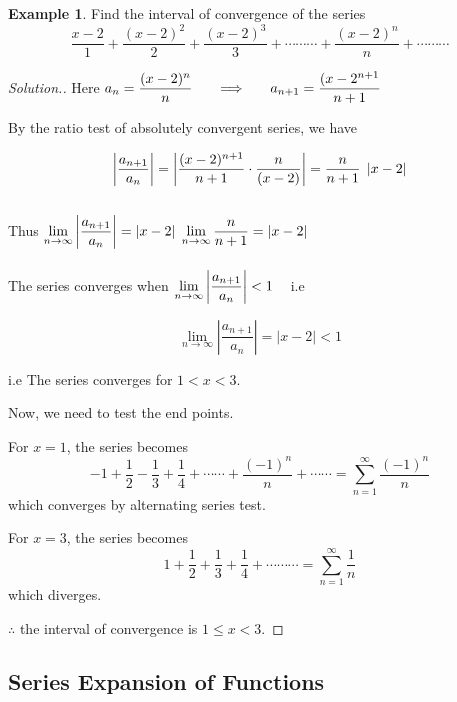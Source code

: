 \documentclass[11pt,a4paper]{article}
\theoremstyle{definition}
\newtheorem{exa}[thm]{Example}
\newenvironment{solution}
  {\renewcommand{\qedsymbol}{}\begin{proof}[\textit{Solution}.]}
  {\end{proof}}
\begin{document}
\begin{exa}


Find the interval of convergence of the series $$\dfrac{x - 2}{1} + \frac{(x - 2)^2}{2} + \dfrac{(x - 2)^3}{3} + \cdots\cdots\cdots + \frac{(x - 2)^n}{n} + \cdots\cdots\cdots$$
\end{exa}

\begin{solution}


Here $\displaystyle{a_n = \frac{(x-2)^n}{n}\hspace{0.5cm} \implies \hspace{0.5cm} a_{n+1} = \frac{(x -2^{n+1}}{n+1}}$


By the ratio test of absolutely convergent series, we have

$$\left|\dfrac{a_{n+1}}{a_n}\right| = \left|\dfrac{(x-2)^{n+1}}{n+1}\cdot \dfrac{n}{(x -2)}\right|= \dfrac{n}{n + 1}\hspace{0.1cm}\left|x - 2\right|$$\\

Thus $\displaystyle{\lim\limits_{n \rightarrow \infty}\left|\dfrac{a_{n+1}}{a_n}\right|= \left|x - 2\right|\hspace{0.1cm}\lim\limits_{n \rightarrow \infty}\dfrac{n}{n + 1}= \left|x - 2\right|}$\\\\

The series converges when $\displaystyle{\lim\limits_{n \rightarrow \infty}\left|\dfrac{a_{n+1}}{a_n}\right| < 1}\hspace{0.3cm}$ i.e

$$\lim\limits_{n \rightarrow \infty}\left|\dfrac{a_{n+1}}{a_n}\right| = \left|x - 2\right| <1$$

i.e The series converges for $1 < x < 3$.


Now, we need to test the end points.


For $x =1$, the series becomes $$-1 + \dfrac{1}{2} - \dfrac{1}{3} + \dfrac{1}{4} + \cdots\cdots + \dfrac{(-1)^n}{n} + \cdots\cdots = \sum^{\infty}_{n= 1} \dfrac{(-1)^n}{n}$$ which converges by alternating series test.


For $x = 3$, the series becomes $$1 + \dfrac{1}{2} + \dfrac{1}{3} + \dfrac{1}{4} +\cdots\cdots\cdots = \sum^{\infty}_{n=1} \frac{1}{n}$$ which diverges.


$\therefore$ the interval of convergence is $1\leq x < 3$.
\end{solution}


\subsection{Series Expansion of Functions}
\end{document}
